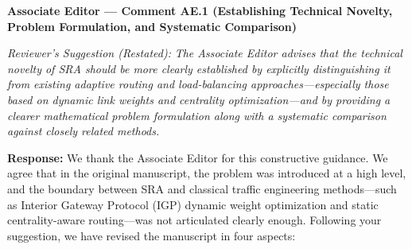 \documentclass[11pt,a4paper]{article}
\newcommand{\cbox}[2]{%
  \vspace{0.6em}\noindent\textbf{#1}\par\smallskip
  \noindent\textit{Reviewer's Suggestion (Restated):} \textit{#2}\par\smallskip
}
\begin{document}
\cbox{Associate Editor --- Comment AE.1 (Establishing Technical Novelty, Problem Formulation, and Systematic Comparison)}{The Associate Editor advises that the technical novelty of SRA should be more clearly established by explicitly distinguishing it from existing adaptive routing and load-balancing approaches---especially those based on dynamic link weights and centrality optimization---and by providing a clearer mathematical problem formulation along with a systematic comparison against closely related methods.}

\noindent\textbf{Response:} We thank the Associate Editor for this constructive guidance. We agree that in the original manuscript, the problem was introduced at a high level, and the boundary between SRA and classical traffic engineering methods---such as Interior Gateway Protocol (IGP) dynamic weight optimization and static centrality-aware routing---was not articulated clearly enough. Following your suggestion, we have revised the manuscript in four aspects:
\end{document}
